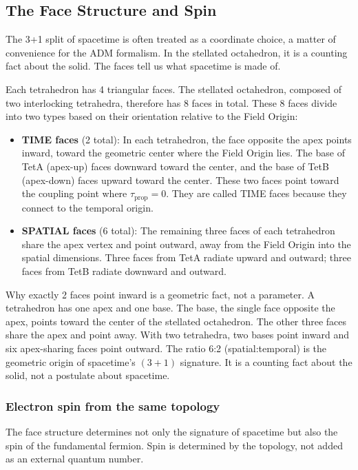 \documentclass[aps,prd,preprint,superscriptaddress,showpacs,preprintnumbers,amsmath,amssymb,nofootinbib]{revtex4-2}
\begin{document}
\subsection{The Face Structure and Spin}
\label{subsec:faces}

The 3+1 split of spacetime is often treated as a coordinate choice, a matter of convenience for the ADM formalism. In the stellated octahedron, it is a counting fact about the solid. The faces tell us what spacetime is made of.

Each tetrahedron has 4 triangular faces. The stellated octahedron, composed of two interlocking tetrahedra, therefore has 8 faces in total. These 8 faces divide into two types based on their orientation relative to the Field Origin:

\begin{itemize}
\item \textbf{TIME faces} (2 total): In each tetrahedron, the face opposite the apex points inward, toward the geometric center where the Field Origin lies. The base of TetA (apex-up) faces downward toward the center, and the base of TetB (apex-down) faces upward toward the center. These two faces point toward the coupling point where $\tau_{\text{prop}} = 0$. They are called TIME faces because they connect to the temporal origin.
\item \textbf{SPATIAL faces} (6 total): The remaining three faces of each tetrahedron share the apex vertex and point outward, away from the Field Origin into the spatial dimensions. Three faces from TetA radiate upward and outward; three faces from TetB radiate downward and outward.
\end{itemize}

Why exactly 2 faces point inward is a geometric fact, not a parameter. A tetrahedron has one apex and one base. The base, the single face opposite the apex, points toward the center of the stellated octahedron. The other three faces share the apex and point away. With two tetrahedra, two bases point inward and six apex-sharing faces point outward. The ratio 6:2 (spatial:temporal) is the geometric origin of spacetime's $(3{+}1)$ signature. It is a counting fact about the solid, not a postulate about spacetime.

\subsubsection*{Electron spin from the same topology}

The face structure determines not only the signature of spacetime but also the spin of the fundamental fermion. Spin is determined by the topology, not added as an external quantum number.
\end{document}
